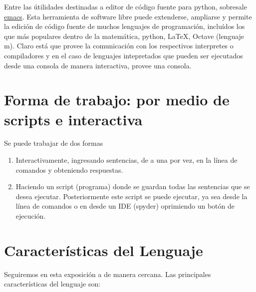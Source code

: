 Entre las útilidades destinadas a editor de código fuente para python, sobresale 
\href{http://www.gnu.org/software/emacs/}{emacs}.
 Esta herramienta de software libre
puede extenderse, ampliarse y permite la edición de código fuente de muchos lenguajes 
de programación, incluídos los que más populares dentro de la matemática, python, \LaTeX, 
Octave (lenguaje m). Claro está que provee la comunicación con los respectivos interpretes 
o compiladores y en el caso de lenguajes intepretados que pueden ser ejecutados desde una 
consola de manera interactiva, provee una consola.

\section{Forma de trabajo: por medio de scripts e interactiva}


Se puede trabajar de dos formas

\begin{enumerate}
\item Interactivamente, ingresando sentencias, de a una por vez, en la línea de comandos y obteniendo respuestas.

\item Haciendo un script (programa) donde se guardan todas las sentencias que se desea ejecutar. Posteriormente este script se puede ejecutar, ya sea desde la línea de comandos o en desde un IDE (spyder) oprimiendo un botón de ejecución.

\end{enumerate}





\section{Características del Lenguaje}

Seguiremos en esta exposición a \cite{wiki_python} de manera cercana. Las principales características del lenguaje son:

